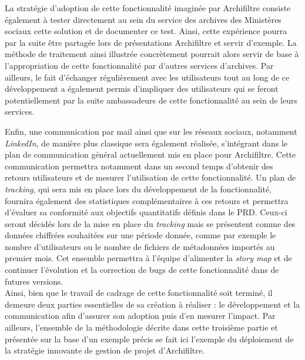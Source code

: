 La stratégie d’adoption de cette fonctionnalité imaginée par \gls{Archifiltre} consiste également à tester directement au sein du service des archives des Ministères sociaux cette solution et de documenter ce test. Ainsi, cette expérience pourra par la suite être partagée lors de présentations \gls{Archifiltre} et servir d’exemple. La méthode de traitement ainsi illustrée concrètement pourrait alors servir de base à l’appropriation de cette fonctionnalité par d’autres services d’archives. Par ailleurs, le fait d’échanger régulièrement avec les utilisateurs tout au long de ce développement a également permis d’impliquer des utilisateurs qui se feront potentiellement par la suite ambassadeurs de cette fonctionnalité au sein de leurs services.


Enfin, une communication par mail ainsi que sur les réseaux sociaux, notamment \textit{LinkedIn}, de manière plus classique sera également réalisée, s’intégrant dans le plan de communication général actuellement mis en place pour \gls{Archifiltre}. Cette communication permettra notamment dans un second temps d’obtenir des retours utilisateurs et de mesurer l’utilisation de cette fonctionnalité. Un plan de \textit{tracking}, qui sera mis en place lors du développement de la fonctionnalité, fournira également des statistiques complémentaires à ces retours et permettra d’évaluer sa conformité aux objectifs quantitatifs définis dans le \gls{PRD}. Ceux-ci seront décidés lors de la mise en place du \textit{tracking} mais se présentent comme des données chiffrées souhaitées sur une période donnée, comme par exemple le nombre d’utilisateurs ou le nombre de fichiers de métadonnées importés au premier mois. Cet ensemble permettra à l’équipe d’alimenter la \textit{\gls{story map}} et de continuer l’évolution et la correction de bugs de cette fonctionnalité dans de futures versions. 
\\

Ainsi, bien que le travail de cadrage de cette fonctionnalité soit terminé, il demeure deux parties essentielles de sa création à réaliser : le développement et la communication afin d’assurer son adoption puis d’en mesurer l’impact. Par ailleurs, l’ensemble de la méthodologie décrite dans cette troisième partie et présentée sur la base d’un exemple précis se fait ici l'exemple du déploiement de la stratégie innovante de gestion de projet d’\gls{Archifiltre}. 
